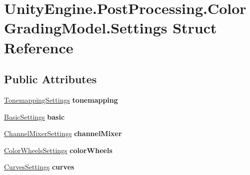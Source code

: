 \hypertarget{struct_unity_engine_1_1_post_processing_1_1_color_grading_model_1_1_settings}{}\section{Unity\+Engine.\+Post\+Processing.\+Color\+Grading\+Model.\+Settings Struct Reference}
\label{struct_unity_engine_1_1_post_processing_1_1_color_grading_model_1_1_settings}
\subsection*{Public Attributes}
\begin{DoxyCompactItemize}
\item 
\mbox{\label{struct_unity_engine_1_1_post_processing_1_1_color_grading_model_1_1_settings_a85039084a9a35443b7cb1cd44511dd36}} 
\mbox{\hyperlink{struct_unity_engine_1_1_post_processing_1_1_color_grading_model_1_1_tonemapping_settings}{Tonemapping\+Settings}} {\bfseries tonemapping}
\item 
\mbox{\label{struct_unity_engine_1_1_post_processing_1_1_color_grading_model_1_1_settings_a14f6045f035a0672774bcc2d487375f6}} 
\mbox{\hyperlink{struct_unity_engine_1_1_post_processing_1_1_color_grading_model_1_1_basic_settings}{Basic\+Settings}} {\bfseries basic}
\item 
\mbox{\label{struct_unity_engine_1_1_post_processing_1_1_color_grading_model_1_1_settings_a8f0f189e614ef9d08b9bfcda0918897d}} 
\mbox{\hyperlink{struct_unity_engine_1_1_post_processing_1_1_color_grading_model_1_1_channel_mixer_settings}{Channel\+Mixer\+Settings}} {\bfseries channel\+Mixer}
\item 
\mbox{\label{struct_unity_engine_1_1_post_processing_1_1_color_grading_model_1_1_settings_ae47ed3b838650ac6bb08560d34b7cd83}} 
\mbox{\hyperlink{struct_unity_engine_1_1_post_processing_1_1_color_grading_model_1_1_color_wheels_settings}{Color\+Wheels\+Settings}} {\bfseries color\+Wheels}
\item 
\mbox{\label{struct_unity_engine_1_1_post_processing_1_1_color_grading_model_1_1_settings_aa60424f37437ea8273e0bf5857176086}} 
\mbox{\hyperlink{struct_unity_engine_1_1_post_processing_1_1_color_grading_model_1_1_curves_settings}{Curves\+Settings}} {\bfseries curves}
\end{DoxyCompactItemize}
